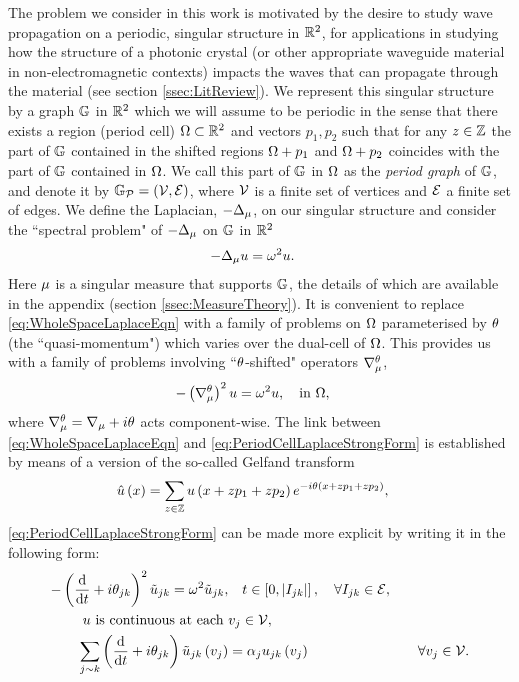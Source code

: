 The problem we consider in this work is motivated by the desire to study wave propagation on a periodic, singular structure in $\mathbb{R}^2$, for applications in studying how the structure of a photonic crystal (or other appropriate waveguide material in non-electromagnetic contexts) impacts the waves that can propagate through the material (see section \ref{ssec:LitReview}).
We represent this singular structure by a graph $\mathbb{G}$ in $\mathbb{R}^2$ which we will assume to be periodic in the sense that there exists a region (period cell) $\Omega\subset\mathbb{R}^2$ and vectors $p_1, p_2$ such that for any $z\in\mathbb{Z}$ the part of $\mathbb{G}$ contained in the shifted regions $\Omega+p_1$ and $\Omega+p_2$ coincides with the part of $\mathbb{G}$ contained in $\Omega$.
We call this part of $\mathbb{G}$ in $\Omega$ as the \emph{period graph} of $\mathbb{G}$, and denote it by $\mathbb{G}_{\mathcal{P}}=\left( \mathcal{V}, \mathcal{E} \right)$, where $\mathcal{V}$ is a finite set of vertices and $\mathcal{E}$ a finite set of edges.
We define the Laplacian, $-\Delta_{\mu}$, on our singular structure and consider the ``spectral problem" of $-\Delta_{\mu}$ on $\mathbb{G}$ in $\mathbb{R}^2$
\begin{align} \label{eq:WholeSpaceLaplaceEqn}
	-\Delta_{\mu} u &= \omega^2 u.
\end{align}
Here $\mu$ is a singular measure that supports $\mathbb{G}$, the details of which are available in the appendix (section \ref{ssec:MeasureTheory}).
It is convenient to replace \eqref{eq:WholeSpaceLaplaceEqn} with a family of problems on $\Omega$ parameterised by $\theta$ (the ``quasi-momentum") which varies over the dual-cell of $\Omega$.
This provides us with a family of problems involving ``$\theta$-shifted" operators $\nabla^{\theta}_{\mu}$,
\begin{align} \label{eq:PeriodCellLaplaceStrongForm}
	-\left( \nabla^{\theta}_{\mu} \right)^2 u &= \omega^2 u, \quad\text{in } \Omega,
\end{align}
where $\nabla^{\theta}_{\mu} = \nabla_{\mu} + i\theta$ acts component-wise.
The link between \eqref{eq:WholeSpaceLaplaceEqn} and \eqref{eq:PeriodCellLaplaceStrongForm} is established by means of a version of the so-called Gelfand transform 
\begin{align*}
	\hat{u}\left( x \right) &= \sum_{z\in\mathbb{Z}}u\left( x+zp_1+zp_2 \right)e^{-i\theta\left( x+zp_1+zp_2 \right)},
\end{align*}
\eqref{eq:PeriodCellLaplaceStrongForm} can be made more explicit by writing it in the following form:
\begin{subequations} \label{eq:QGFullSystem}
	\begin{align}
		-\left( \dfrac{\mathrm{d}}{\mathrm{d}t} + i\theta_{jk} \right)^2 \tilde{u}_{jk} = \omega^2 \tilde{u}_{jk}, &\quad t\in\left[ 0,\left\lvert I_{jk} \right\rvert \right], \quad \forall I_{jk}\in \mathcal{E}, \label{eq:QGEdgeODEs} \\
		u \text{ is continuous at each } &v_j \in \mathcal{V}, \label{eq:QGVertCty}\\
		\sum_{j\sim k}\left( \dfrac{\mathrm{d}}{\mathrm{d}t} + i\theta_{jk} \right)\tilde{u}_{jk}\left( v_j \right) &= \alpha_{j}u_{jk}\left( v_j \right) &\quad \forall v_j \in \mathcal{V}. \label{eq:QGDerivCondition}
	\end{align}
\end{subequations}
